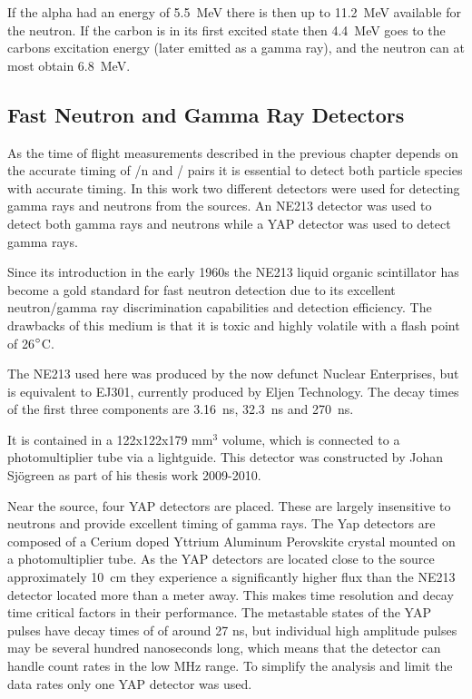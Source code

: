 \documentclass[main.tex]{subfiles}
\begin{document}
If the alpha had an energy of \SI{5.5}{\MeV} there is then up to \SI{11.2}{\MeV} available for the neutron. If the carbon is in its first excited state then \SI{4.4}{\MeV} goes to the carbons excitation energy (later emitted as a gamma ray), and the neutron can at most obtain \SI{6.8}{\MeV}. 



\subsection{Fast Neutron and Gamma Ray Detectors}
As the time of flight measurements described in the previous chapter depends on the accurate timing of \textgamma /n and \textgamma /\textgamma\; pairs it is essential to detect both particle species with accurate timing. In this work two different detectors were used for detecting gamma rays and neutrons from the sources. An NE213 detector was used to detect both gamma rays and neutrons while a YAP detector was used to detect gamma rays. 

Since its introduction in the early 1960s the NE213 liquid organic scintillator has become a gold standard for fast neutron detection due to its excellent neutron/gamma ray discrimination capabilities and detection efficiency. The drawbacks of this medium is that it is toxic and highly volatile with a flash point of 26$\text{\degree}$C. 

The NE213 used here was produced by the now defunct Nuclear Enterprises, but is equivalent to EJ301, currently produced by Eljen Technology. The decay times of the first three components are \SI{3.16}{ns}, \SI{32.3}{ns} and \SI{270}{ns}\cite{Eljen}.

It is contained in a 122x122x179 \si{\mm}$^\text{3}$ volume, which is connected to a photomultiplier tube via a lightguide. This detector was constructed by Johan Sjögreen as part of his thesis work 2009-2010\cite{sjogren}.

Near the source, four YAP detectors are placed. These are largely insensitive to neutrons and provide excellent timing of gamma rays. The Yap detectors are composed of a Cerium doped Yttrium Aluminum Perovskite crystal mounted on a photomultiplier tube. As the YAP detectors are located close to the source approximately \si{10\cm} they experience a significantly higher flux than the NE213 detector located more than a meter away. This makes time resolution and decay time critical factors in their performance. The metastable states of the YAP pulses have decay times of of around 27 ns, but individual high amplitude pulses may be several hundred nanoseconds long, which means that the detector can handle count rates in the low MHz range. To simplify the analysis and limit the data rates only one YAP detector was used.
\end{document}
